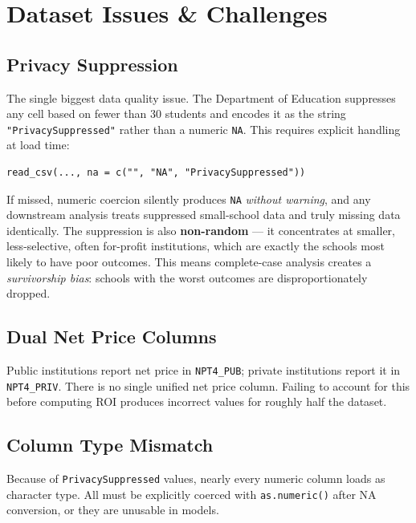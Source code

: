 \documentclass[12pt, letterpaper]{article}
\begin{document}
\section{Dataset Issues \& Challenges}

\subsection{Privacy Suppression}

The single biggest data quality issue. The Department of Education suppresses any cell based on fewer than 30 students and encodes it as the string \texttt{"PrivacySuppressed"} rather than a numeric \texttt{NA}. This requires explicit handling at load time:

\begin{verbatim}
read_csv(..., na = c("", "NA", "PrivacySuppressed"))
\end{verbatim}

If missed, numeric coercion silently produces \texttt{NA} \textit{without warning}, and any downstream analysis treats suppressed small-school data and truly missing data identically. The suppression is also \textbf{non-random} — it concentrates at smaller, less-selective, often for-profit institutions, which are exactly the schools most likely to have poor outcomes. This means complete-case analysis creates a \textit{survivorship bias}: schools with the worst outcomes are disproportionately dropped.

\subsection{Dual Net Price Columns}

Public institutions report net price in \texttt{NPT4\_PUB}; private institutions report it in \texttt{NPT4\_PRIV}. There is no single unified net price column. Failing to account for this before computing ROI produces incorrect values for roughly half the dataset.

\subsection{Column Type Mismatch}

Because of \texttt{PrivacySuppressed} values, nearly every numeric column loads as character type. All must be explicitly coerced with \texttt{as.numeric()} after NA conversion, or they are unusable in models.
\end{document}
